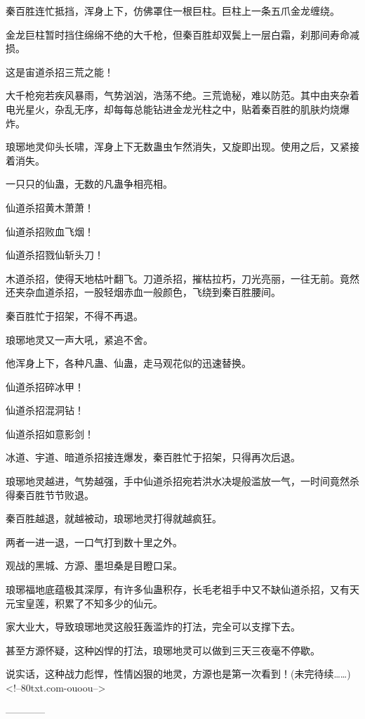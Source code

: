 \begin{this_body}
秦百胜连忙抵挡，浑身上下，仿佛罩住一根巨柱。巨柱上一条五爪金龙缠绕。

金龙巨柱暂时挡住绵绵不绝的大千枪，但秦百胜却双鬓上一层白霜，刹那间寿命减损。

这是宙道杀招三荒之能！

大千枪宛若疾风暴雨，气势汹汹，浩荡不绝。三荒诡秘，难以防范。其中由夹杂着电光星火，杂乱无序，却每每总能钻进金龙光柱之中，贴着秦百胜的肌肤灼烧爆炸。

琅琊地灵仰头长啸，浑身上下无数蛊虫乍然消失，又旋即出现。使用之后，又紧接着消失。

一只只的仙蛊，无数的凡蛊争相亮相。

仙道杀招黄木萧萧！

仙道杀招败血飞烟！

仙道杀招戮仙斩头刀！

木道杀招，使得天地枯叶翻飞。刀道杀招，摧枯拉朽，刀光亮丽，一往无前。竟然还夹杂血道杀招，一股轻烟赤血一般颜色，飞绕到秦百胜腰间。

秦百胜忙于招架，不得不再退。

琅琊地灵又一声大吼，紧追不舍。

他浑身上下，各种凡蛊、仙蛊，走马观花似的迅速替换。

仙道杀招碎冰甲！

仙道杀招混洞钻！

仙道杀招如意影剑！

冰道、宇道、暗道杀招接连爆发，秦百胜忙于招架，只得再次后退。

琅琊地灵越进，气势越强，手中仙道杀招宛若洪水决堤般滥放一气，一时间竟然杀得秦百胜节节败退。

秦百胜越退，就越被动，琅琊地灵打得就越疯狂。

两者一进一退，一口气打到数十里之外。

观战的黑城、方源、墨坦桑是目瞪口呆。

琅琊福地底蕴极其深厚，有许多仙蛊积存，长毛老祖手中又不缺仙道杀招，又有天元宝皇莲，积累了不知多少的仙元。

家大业大，导致琅琊地灵这般狂轰滥炸的打法，完全可以支撑下去。

甚至方源怀疑，这种凶悍的打法，琅琊地灵可以做到三天三夜毫不停歇。

说实话，这种战力彪悍，性情凶狠的地灵，方源也是第一次看到！(未完待续……)<!--80txt.com-ouoou-->

------------

\end{this_body}

